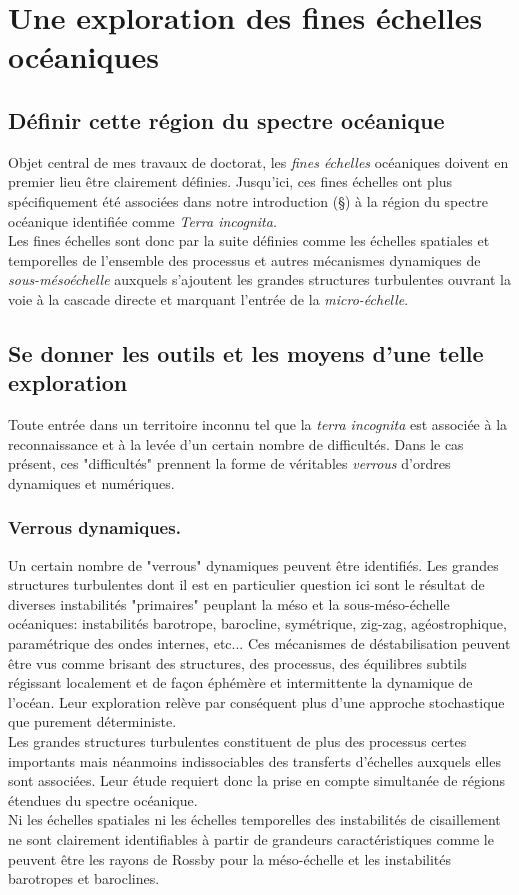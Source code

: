 \color{black}

\color{blue}
\section{Une exploration des fines échelles océaniques}
\subsection{Définir cette région du spectre océanique}
Objet central de mes travaux de doctorat, les \textit{fines échelles} océaniques doivent en premier lieu être clairement définies. Jusqu'ici, ces fines échelles ont plus spécifiquement été associées dans notre introduction (\S {}) à la région du spectre océanique identifiée comme \textit{Terra incognita}.\\
Les fines échelles sont donc par la suite définies comme les échelles spatiales et temporelles de l'ensemble des processus et autres mécanismes dynamiques de \textit{sous-mésoéchelle} \citep{mcwilliams_submesoscale_2016} auxquels s'ajoutent les grandes structures turbulentes ouvrant la voie à la cascade directe et marquant l'entrée de la \textit{micro-échelle}.
 \color{black}

\subsection{Se donner les outils et les moyens d'une telle exploration}
\color{blue}
Toute entrée dans un territoire inconnu tel que la \textit{terra incognita} est associée à la reconnaissance et à la levée d'un certain nombre de difficultés. Dans le cas présent, ces "difficultés" prennent la forme de véritables \textit{verrous} d'ordres dynamiques et numériques.
\subsubsection{Verrous dynamiques.}
Un certain nombre de "verrous" dynamiques peuvent être identifiés. Les grandes structures turbulentes dont il est en particulier question ici sont le résultat de diverses instabilités "primaires" peuplant la méso et la sous-méso-échelle océaniques: instabilités barotrope, barocline, symétrique, zig-zag, agéostrophique, paramétrique des ondes internes, etc... Ces mécanismes de déstabilisation peuvent être vus comme brisant des structures, des processus, des équilibres subtils régissant localement et de façon éphémère et intermittente la dynamique de l'océan. Leur exploration relève par conséquent plus d'une approche stochastique que purement déterministe.\\
Les grandes structures turbulentes constituent de plus des processus certes importants mais néanmoins indissociables des transferts d'échelles auxquels elles sont associées. Leur étude requiert donc la prise en compte simultanée de régions étendues du spectre océanique.\\
Ni les échelles spatiales ni les échelles temporelles des instabilités de cisaillement ne sont clairement identifiables à partir de grandeurs caractéristiques comme le peuvent être les rayons de Rossby pour la méso-échelle et les instabilités barotropes et baroclines.
